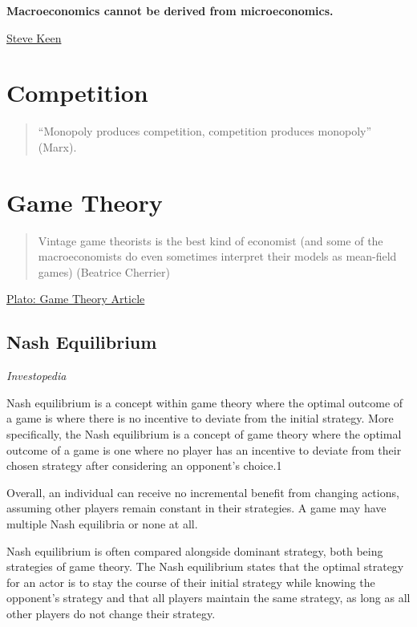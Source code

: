 \documentclass[
]{book}
\begin{document}
\textbf{Macroeconomics cannot be derived from microeconomics.}

\href{https://evonomics.com/why-economists-have-to-embrace-complexity-steve-keen/}{Steve Keen}

\hypertarget{competition}{%
\chapter{Competition}\label{competition}}

\begin{quote}
``Monopoly produces competition, competition produces monopoly'' (Marx).
\end{quote}

\hypertarget{game-theory}{%
\chapter{Game Theory}\label{game-theory}}

\begin{quote}
Vintage game theorists is the best kind of economist (and some of the macroeconomists do even sometimes interpret their models as mean-field games)
(Beatrice Cherrier)
\end{quote}

\href{https://plato.stanford.edu/entries/game-theory/}{Plato: Game Theory Article}

\hypertarget{nash-equilibrium}{%
\section{Nash Equilibrium}\label{nash-equilibrium}}

\emph{Investopedia}

Nash equilibrium is a concept within game theory where the optimal outcome of a game is where there is no incentive to deviate from the initial strategy. More specifically, the Nash equilibrium is a concept of game theory where the optimal outcome of a game is one where no player has an incentive to deviate from their chosen strategy after considering an opponent's choice.1

Overall, an individual can receive no incremental benefit from changing actions, assuming other players remain constant in their strategies. A game may have multiple Nash equilibria or none at all.

Nash equilibrium is often compared alongside dominant strategy, both being strategies of game theory. The Nash equilibrium states that the optimal strategy for an actor is to stay the course of their initial strategy while knowing the opponent's strategy and that all players maintain the same strategy, as long as all other players do not change their strategy.
\end{document}
